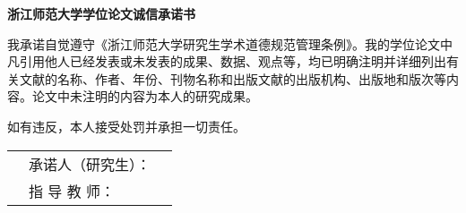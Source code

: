 \clearpage
{}
{}
\begin{center}
    \bfseries
    浙江师范大学学位论文诚信承诺书
\end{center}

\vspace{60pt}

{\linespread{1.8}

    我承诺自觉遵守《浙江师范大学研究生学术道德规范管理条例》。我的学位论文中凡引用他人已经发表或未发表的成果、数据、观点等，均已明确注明并详细列出有关文献的名称、作者、年份、刊物名称和出版文献的出版机构、出版地和版次等内容。论文中未注明的内容为本人的研究成果。

    如有违反，本人接受处罚并承担一切责任。\par
}

\vspace{90pt}

\begin{table}[h]
    \begin{tabularx}{\linewidth}{X p{7.5em} p{6em}}
        & 承诺人（研究生）：& \\
        & 指 \hfill 导 \hfill 教 \hfill 师：&
    \end{tabularx}
\end{table}
